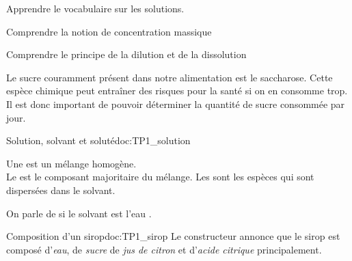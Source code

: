 \teteSndSolu

\vspace*{-36pt}

\begin{objectifs}
  \item Apprendre le vocabulaire sur les solutions.
  \item Comprendre la notion de concentration massique
  \item Comprendre le principe de la dilution et de la dissolution
\end{objectifs}


\begin{contexte}
  Le sucre couramment présent dans notre alimentation est le saccharose.
  Cette espèce chimique peut entraîner des risques pour la santé si on en consomme trop.
  Il est donc important de pouvoir déterminer la quantité de sucre consommée par jour.

\end{contexte}


\begin{doc}{Solution, solvant et soluté}{doc:TP1_solution}
  \begin{importants}
    \chevron Une  est un mélange homogène. \\
    Le  est le composant majoritaire du mélange.
    Les  sont les espèces qui sont dispersées dans le solvant.
  \end{importants}
  
  \begin{center}
  \end{center}
  
  \begin{importants}
    On parle de  si le solvant est l'eau .
  \end{importants}
\end{doc}

\begin{doc}{Composition d'un sirop}{doc:TP1_sirop}
  Le constructeur annonce que le sirop est composé d'\textit{eau}, de \textit{sucre} de \textit{jus de citron} et d'\textit{acide citrique} principalement.
\end{doc}


